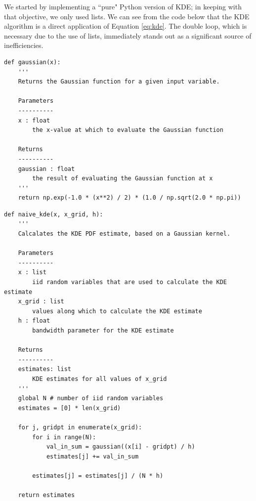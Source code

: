 \documentclass[11pt]{article}
\begin{document}
\noindent We started by implementing a ``pure" Python version of KDE; in keeping with that objective, we only used lists. We can see from the code below that the KDE algorithm is a direct application of Equation \ref{eq:kde}. The double loop, which is necessary due to the use of lists, immediately stands out as a significant source of inefficiencies.

\begin{framed}
\begin{singlespacing}
\begin{scriptsize}
\begin{verbatim}
def gaussian(x):
    '''
    Returns the Gaussian function for a given input variable.
    
    Parameters
    ----------
    x : float
        the x-value at which to evaluate the Gaussian function
        
    Returns
    ----------
    gaussian : float
        the result of evaluating the Gaussian function at x
    '''
    return np.exp(-1.0 * (x**2) / 2) * (1.0 / np.sqrt(2.0 * np.pi))
\end{verbatim}
\end{scriptsize}
\end{singlespacing}
\end{framed}

\newpage

\begin{framed}
\begin{singlespacing}
\begin{scriptsize}
\begin{verbatim}
def naive_kde(x, x_grid, h):
    '''
    Calcalates the KDE PDF estimate, based on a Gaussian kernel.
    
    Parameters
    ----------
    x : list
        iid random variables that are used to calculate the KDE estimate
    x_grid : list
        values along which to calculate the KDE estimate
    h : float
        bandwidth parameter for the KDE estimate
        
    Returns
    ----------
    estimates: list
        KDE estimates for all values of x_grid
    '''
    global N # number of iid random variables
    estimates = [0] * len(x_grid)
    
    for j, gridpt in enumerate(x_grid):
        for i in range(N):
            val_in_sum = gaussian((x[i] - gridpt) / h)
            estimates[j] += val_in_sum
        
        estimates[j] = estimates[j] / (N * h)
    
    return estimates
\end{verbatim}
\end{scriptsize}
\end{singlespacing}
\end{framed}
\end{document}
